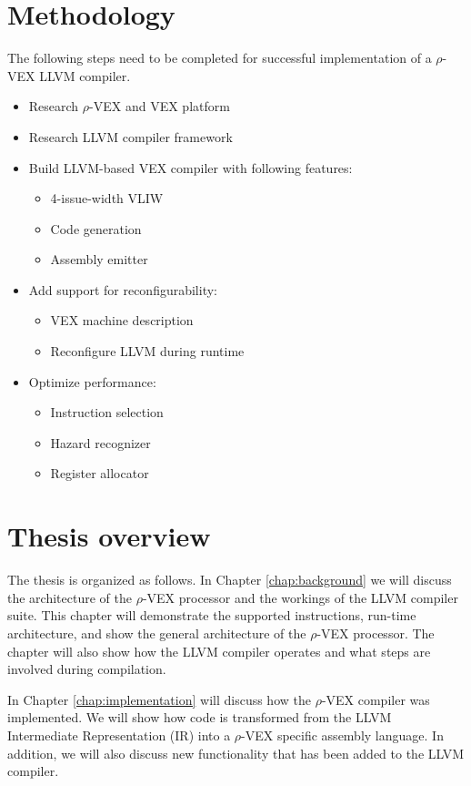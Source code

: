 \section{Methodology}
The following steps need to be completed for successful implementation of a $\rho$-VEX LLVM compiler.
\begin{itemize}
	\item Research $\rho$-VEX and VEX platform
	\item Research LLVM compiler framework
	\item Build LLVM-based VEX compiler with following features:
	\begin{itemize}
		\item 4-issue-width VLIW
		\item Code generation
		\item Assembly emitter
	\end{itemize}
	\item Add support for reconfigurability:
		\begin{itemize}
			\item VEX machine description
			\item Reconfigure LLVM during runtime
		\end{itemize}	
	\item Optimize performance:
	\begin{itemize}
		\item Instruction selection
		\item Hazard recognizer
		\item Register allocator
	\end{itemize}	
\end{itemize}




\section{Thesis overview}
The thesis is organized as follows. 
In Chapter \ref{chap:background} we will discuss the architecture of the $\rho$-VEX processor and the workings of the LLVM compiler suite. This chapter will demonstrate the supported instructions, run-time architecture, and show the general architecture of the $\rho$-VEX processor. The chapter will also show how the LLVM compiler operates and what steps are involved during compilation.

In Chapter \ref{chap:implementation} will discuss how the $\rho$-VEX compiler was implemented. We will show how code is transformed from the LLVM Intermediate Representation (IR) into a $\rho$-VEX specific assembly language. In addition, we will also discuss new functionality that has been added to the LLVM compiler.

